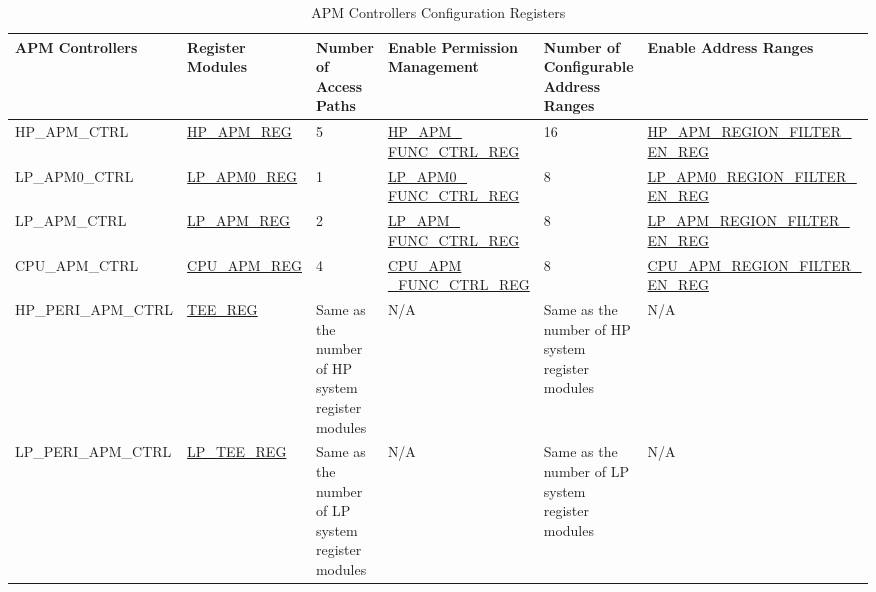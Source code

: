 \documentclass[main\_\_EN.tex]{subfiles}
\begin{document}
\begin{footnotesize}
\begin{longtable}[C]{|L{2.5cm}|l|L{1.9cm}|L{2.8cm}|L{2.2cm}|L{3.5cm}|}
    \caption{APM Controllers Configuration Registers}
    \label{tab:apm-reg}\\\hline
    \textbf{APM Controllers} & \textbf{Register Modules} & \textbf{Number of Access Paths} & \textbf{Enable Permission Management} & \textbf{Number of Configurable Address Ranges} & \textbf{Enable Address Ranges}\\ \hline
    \endfirsthead
    \endlastfoot

   HP\_APM\_CTRL & \hyperref[sec:permctrl-reg-hp]{HP\_APM\_REG} &  5 &\hyperref[regdesc:HPAPMFUNCCTRLREG]{HP\_APM\_ FUNC\_CTRL\_REG} & 16 & \hyperref[fielddesc:HPAPMREGIONFILTEREN]{HP\_APM\_REGION\_FILTER\_ EN\_REG}\\ \hline

   LP\_APM0\_CTRL & \hyperref[sec:permctrl-reg-lp0]{LP\_APM0\_REG} &  1 & \hyperref[regdesc:LPAPM0FUNCCTRLREG]{LP\_APM0\_ FUNC\_CTRL\_REG} & 8 & \hyperref[fielddesc:LPAPM0REGIONFILTEREN]{LP\_APM0\_REGION\_FILTER\_ EN\_REG}\\ \hline

   LP\_APM\_CTRL & \hyperref[sec:permctrl-reg-lp]{LP\_APM\_REG} &  2 & \hyperref[regdesc:LPAPMFUNCCTRLREG]{LP\_APM\_ FUNC\_CTRL\_REG} & 8 & \hyperref[fielddesc:LPAPMREGIONFILTEREN]{LP\_APM\_REGION\_FILTER\_ EN\_REG}\\ \hline

    CPU\_APM\_CTRL & \hyperref[sec:permctrl-reg-cpu]{CPU\_APM\_REG} &  4 & \hyperref[regdesc:CPUAPMFUNCCTRLREG]{CPU\_APM \_FUNC\_CTRL\_REG} & 8 & \hyperref[fielddesc:CPUAPMREGIONFILTEREN]{CPU\_APM\_REGION\_FILTER\_ EN\_REG}\\ \hline

    HP\_PERI\_APM\_CTRL & \hyperref[sec:permctrl-reg-hp-tee]{TEE\_REG} &  Same as the number of HP system register modules & N/A & Same as the number of HP system register modules & N/A\\ \hline

    LP\_PERI\_APM\_CTRL & \hyperref[sec:permctrl-reg-lp-tee]{LP\_TEE\_REG} &  Same as the number of LP system register modules & N/A & Same as the number of LP system register modules & N/A\\ \hline

\end{longtable}
\end{footnotesize}
\end{document}
